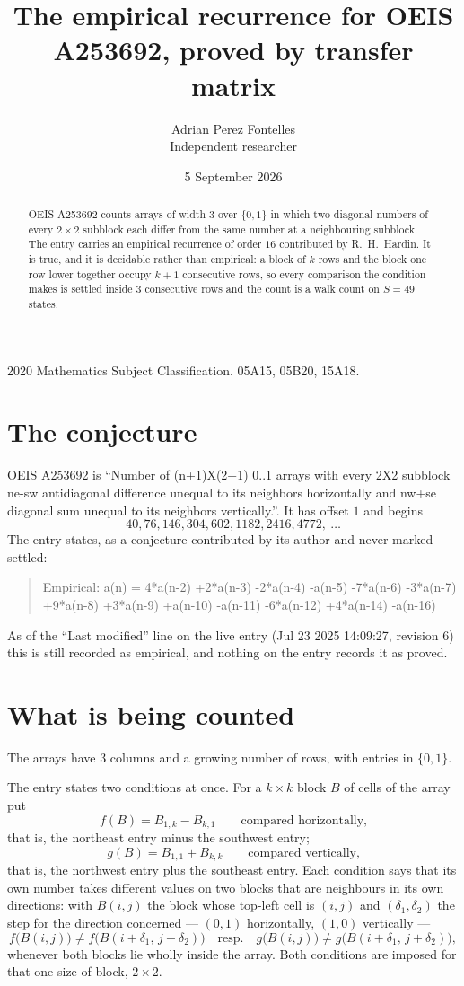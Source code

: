 \documentclass[11pt,a4paper]{article}
\title{The empirical recurrence for OEIS A253692, proved by transfer matrix}
\author{Adrian Perez Fontelles\\ \small Independent researcher}
\date{5 September 2026}
\theoremstyle{plain}
\theoremstyle{definition}
\begin{document}
\maketitle

\begin{abstract}
OEIS A253692 counts arrays of width $3$ over $\{0,1\}$ in which two diagonal numbers of every $2\times2$ subblock each differ from the same number at a neighbouring subblock. The entry carries an
empirical recurrence of order $16$ contributed by R.~H.~Hardin. It is true, and it is
decidable rather than empirical: a block of $k$ rows and the block one row lower together
occupy $k+1$ consecutive rows, so every comparison the condition makes is settled inside
$3$ consecutive rows and the count is a walk count on $S=49$ states.
\end{abstract}

\noindent\small 2020 Mathematics Subject Classification. 05A15, 05B20, 15A18.\normalsize

\section{The conjecture}

OEIS A253692 is ``Number of (n+1)X(2+1) 0..1 arrays with every 2X2 subblock ne-sw antidiagonal difference unequal to its neighbors horizontally and nw+se diagonal sum unequal to its neighbors vertically.''. It has offset $1$ and begins
\[
40, 76, 146, 304, 602, 1182, 2416, 4772,\ \dots
\]
The entry states, as a conjecture contributed by its author and never marked settled:
\begin{quote}
Empirical: a(n) = 4*a(n-2) +2*a(n-3) -2*a(n-4) -a(n-5) -7*a(n-6) -3*a(n-7) +9*a(n-8) +3*a(n-9) +a(n-10) -a(n-11) -6*a(n-12) +4*a(n-14) -a(n-16)
\end{quote}
As of the ``Last modified'' line on the live entry (Jul 23 2025 14:09:27, revision 6) this is still
recorded as empirical, and nothing on the entry records it as proved.

\section{What is being counted}

The arrays have $3$ columns and a growing number of rows, with entries in $\{0,1\}$.

The entry states two conditions at once. For a $k\times k$ block $B$ of
cells of the array put
\[
f(B)=B_{1,k}-B_{k,1}\qquad\text{compared horizontally,}
\]
that is, the northeast entry minus the southwest entry;
\[
g(B)=B_{1,1}+B_{k,k}\qquad\text{compared vertically,}
\]
that is, the northwest entry plus the southeast entry.
Each condition says that its own number takes different values on two blocks that are
neighbours in its own directions: with $B(i,j)$ the block whose top-left cell is $(i,j)$ and
$(\delta_1,\delta_2)$ the step for the direction concerned --- $(0,1)$ horizontally, $(1,0)$ vertically ---
\[
f\bigl(B(i,j)\bigr)\neq f\bigl(B(i+\delta_1,\,j+\delta_2)\bigr)
\quad\text{resp.}\quad
g\bigl(B(i,j)\bigr)\neq g\bigl(B(i+\delta_1,\,j+\delta_2)\bigr),
\]
whenever both blocks lie wholly inside the array. Both conditions are imposed for that one size of block,
$2\times2$.
\end{document}
